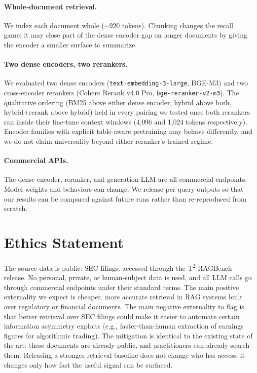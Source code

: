 \documentclass{article}
\begin{document}
\paragraph{Whole-document retrieval.} We index each document whole ($\sim$920 tokens). Chunking changes the recall game; it may close part of the dense encoder gap on longer documents by giving the encoder a smaller surface to summarize.

\paragraph{Two dense encoders, two rerankers.} We evaluated two dense encoders (\texttt{text-embedding-3-large}, BGE-M3) and two cross-encoder rerankers (Cohere Rerank v4.0 Pro, \texttt{bge-reranker-v2-m3}). The qualitative ordering (BM25 above either dense encoder, hybrid above both, hybrid+rerank above hybrid) held in every pairing we tested once both rerankers ran inside their fine-tune context windows (4{,}096 and 1{,}024 tokens respectively). Encoder families with explicit table-aware pretraining may behave differently, and we do not claim universality beyond either reranker's trained regime.

\paragraph{Commercial APIs.} The dense encoder, reranker, and generation LLM are all commercial endpoints. Model weights and behaviors can change. We release per-query outputs so that our results can be compared against future runs rather than re-reproduced from scratch.

\section*{Ethics Statement}

The source data is public: SEC filings, accessed through the T\textsuperscript{2}-RAGBench release. No personal, private, or human-subject data is used, and all LLM calls go through commercial endpoints under their standard terms. The main positive externality we expect is cheaper, more accurate retrieval in RAG systems built over regulatory or financial documents. The main negative externality to flag is that better retrieval over SEC filings could make it easier to automate certain information asymmetry exploits (e.g., faster-than-human extraction of earnings figures for algorithmic trading). The mitigation is identical to the existing state of the art: these documents are already public, and practitioners can already search them. Releasing a stronger retrieval baseline does not change who has access; it changes only how fast the useful signal can be surfaced.
\end{document}
